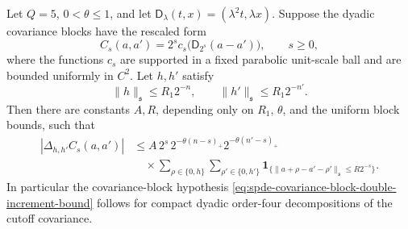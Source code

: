 \begin{corollary}
\label{cor:spde-covariance-block-double-increment-bound}
Let \(Q=5\), \(0<\theta\leq1\), and let
\(\mathsf D_\lambda(t,x)=(\lambda^2t,\lambda x)\).  Suppose the dyadic
covariance blocks have the rescaled form
\[
  C_s(a,a')=2^s c_s\bigl(\mathsf D_{2^s}(a-a')\bigr),
  \qquad s\geq0,
\]
where the functions \(c_s\) are supported in a fixed parabolic unit-scale
ball and are bounded uniformly in \(C^2\).  Let \(h,h'\) satisfy
\[
  \|h\|_{\mathfrak s}\leq R_1 2^{-n},
  \qquad
  \|h'\|_{\mathfrak s}\leq R_1 2^{-n'} .
\]
Then there are constants \(A,R\), depending only on \(R_1\), \(\theta\), and
the uniform block bounds, such that
\begin{equation}
\begin{aligned}
  |\Delta_{h,h'}C_s(a,a')|
  &\leq
  A\,2^s\,
  2^{-\theta(n-s)_+}
  2^{-\theta(n'-s)_+}                                   \\
  &\quad\times
  \sum_{\rho\in\{0,h\}}\sum_{\rho'\in\{0,h'\}}
  \mathbf 1_{\{\|a+\rho-a'-\rho'\|_{\mathfrak s}\leq R2^{-s}\}} .
\end{aligned}
  \label{eq:spde-covariance-double-increment-verified}
\end{equation}
In particular the covariance-block hypothesis
\eqref{eq:spde-covariance-block-double-increment-bound} follows for compact
dyadic order-four decompositions of the cutoff covariance.
\end{corollary}

